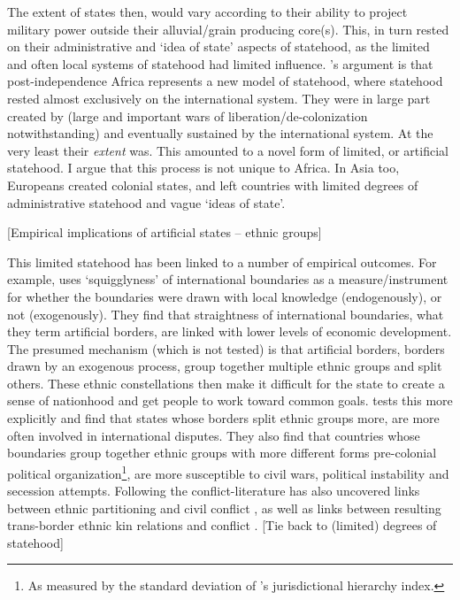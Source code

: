 \documentclass[12pt]{article}
\begin{document}
The extent of states then, would vary according to their ability to project
military power outside their alluvial/grain producing core(s). This, in turn
rested on their administrative and `idea of state' aspects of statehood, as the
limited and often local systems of statehood had limited influence.
\citet{Clapham1996}'s argument is that post-independence Africa represents a new
model of statehood, where statehood rested almost exclusively on the
international system. They were in large part created by (large and important
wars of liberation/de-colonization notwithstanding) and eventually sustained by
the international system. At the very least their \textit{extent} was. This
amounted to a novel form of limited, or artificial statehood. I argue that this
process is not unique to Africa. In Asia too, Europeans created colonial states,
and left countries with limited degrees of administrative statehood and vague
`ideas of state'.

[Empirical implications of artificial states -- ethnic groups]

This limited statehood has been linked to a number of empirical outcomes. For
example, \citet{Alesina2011} uses `squigglyness' of international boundaries as
a measure/instrument for whether the boundaries were drawn with local knowledge
(endogenously), or not (exogenously). They find that straightness of
international boundaries, what they term artificial borders, are linked with
lower levels of economic development. The presumed mechanism (which is not
tested) is that artificial borders, borders drawn by an exogenous process, group
together multiple ethnic groups and split others. These ethnic constellations
then make it difficult for the state to create a sense of nationhood and get
people to work toward common goals. \citet{Englebert2002} tests this more
explicitly and find that states whose borders split ethnic groups more, are more
often involved in international disputes. They also find that countries whose
boundaries group together ethnic groups with more different forms pre-colonial
political organization\footnote{As measured by the standard deviation of
\citet{Murdock1967}'s jurisdictional hierarchy index.}, are more susceptible to
civil wars, political instability and secession attempts. Following
\citet{Englebert2002} the conflict-literature has also uncovered links between
ethnic partitioning and civil conflict \citep{Ito2020}, as well as links between
resulting trans-border ethnic kin relations and conflict \citep{Cederman2013,
Salehyan2009, Weidmann2015}. [Tie back to (limited) degrees of statehood]
\end{document}
